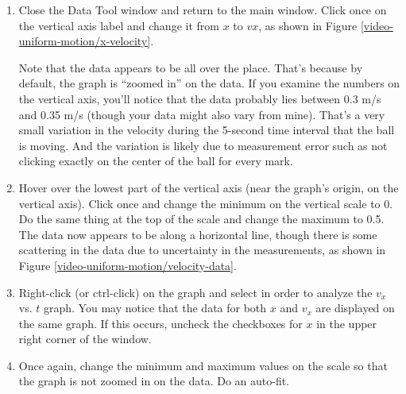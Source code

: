 \begin{enumerate}
	
	
	\item Close the Data Tool window and return to the main window. Click once on the vertical axis label and change it from $x$ to $vx$, as shown in Figure \ref{video-uniform-motion/x-velocity}.
	
		
	
Note that the data appears to be all over the place. That's because by default, the graph is ``zoomed in'' on the data. If you examine the numbers on the vertical axis, you'll notice that the data probably lies between 0.3 m/s and 0.35 m/s (though your data might also vary from mine). That's a very small variation in the velocity during the 5-second time interval that the ball is moving. And the variation is likely due to measurement error such as not clicking exactly on the center of the ball for every mark.
	
	\item Hover over the lowest part of the vertical axis (near the graph's origin, on the vertical axis). Click once and change the minimum on the vertical scale to 0. Do the same thing at the top of the scale and change the maximum to 0.5. The data now appears to be along a horizontal line, though there is some scattering in the data due to uncertainty in the measurements, as shown in Figure \ref{video-uniform-motion/velocity-data}.
	
	
	\item Right-click (or ctrl-click) on the graph and select  in order to analyze the $v_x$ vs. $t$ graph. You may notice that the data for both $x$ and $v_x$ are displayed on the same graph. If this occurs, uncheck the checkboxes for $x$ in the upper right corner of the window.  
	
	\item Once again, change the minimum and maximum values on the scale so that the graph is not zoomed in on the data. Do an auto-fit. 
	
	
	

\end{enumerate}
